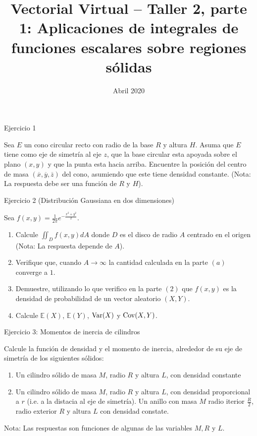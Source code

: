 \documentclass[usepdftitle=false]{beamer}
\title[]{Vectorial Virtual -- Taller 2, parte 1: Aplicaciones de integrales de funciones escalares sobre regiones s\'olidas}
\date{Abril 2020}
\begin{document}
\begin{frame}
  \titlepage
\end{frame}

\begin{frame}{Ejercicio 1}

Sea $E$ un cono circular recto con radio de la base $R$ y altura $H$. Asuma que $E$ tiene como eje de simetr\'ia al eje $z$, que la base circular esta apoyada sobre el plano $(x,y)$ y que la punta esta hacia arriba. Encuentre la posici\'on del centro de masa $(\overline{x}, \overline{y}, \overline{z})$ del cono, asumiendo que este tiene densidad constante. (Nota: La respuesta debe ser una funci\'on de $R$ y $H$). 

\end{frame}

\begin{frame}{Ejercicio 2 (Distribuci\'on Gaussiana en dos dimensiones)}

Sea $f(x,y)= \frac{1}{2\pi} e^{-\frac{x^2+y^2}{2}}$.
\begin{enumerate}
\item Calcule $\iint_Df(x,y)dA$ donde $D$ es el disco de radio $A$ centrado en el origen (Nota: La respuesta depende de $A$).
\item Verifique que, cuando $A\rightarrow \infty$ la cantidad calculada en la parte $(a)$ converge a $1$.
\item Demuestre, utilizando lo que verifico en la parte $(2)$ que $f(x,y)$ es la densidad de probabilidad de un vector aleatorio $(X,Y)$.
\item Calcule $\mathbb{E}(X)$, $\mathbb{E}(Y)$, ${\rm Var}(X)$ y ${\rm Cov}(X,Y)$.
 
\end{enumerate}
\end{frame}

\begin{frame}{Ejercicio 3: Momentos de inercia de cilindros}

Calcule la funci\'on de densidad y el momento de inercia, alrededor de su eje de simetr\'ia de los siguientes s\'olidos:

\begin{enumerate}
\item Un cilindro s\'olido de masa $M$, radio $R$ y altura $L$, con densidad constante
\item Un cilindro s\'olido de masa $M$, radio $R$ y altura $L$, con densidad proporcional a $r$ (i.e. a la distacia al eje de simetr\'ia).
\iem Un anillo con masa $M$ radio iterior $\frac{R}{2}$, radio exterior $R$ y altura $L$ con densidad constate. 
\end{enumerate}
Nota: Las respuestas son funciones de algunas de las variables $M,R$ y $L$.
\end{frame}
\end{document}
